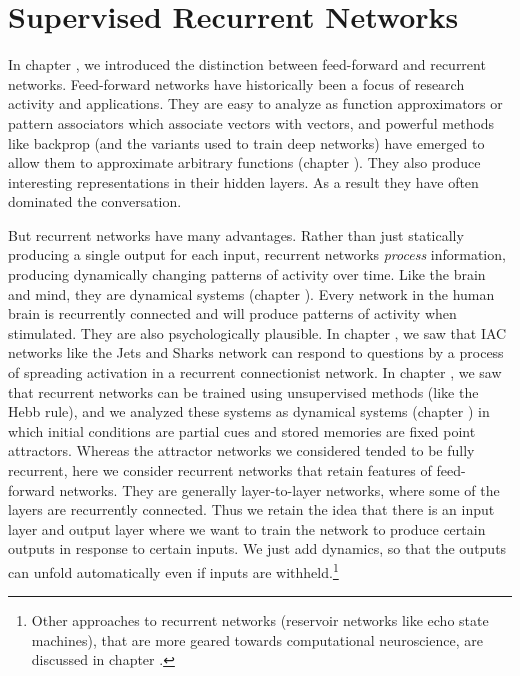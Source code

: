 \chapter{Supervised Recurrent Networks}\label{ch_supervised_recurrent}


In chapter , we introduced the distinction between feed-forward and recurrent networks. Feed-forward networks have historically been a focus of research activity and applications. They are easy to analyze as function approximators or pattern associators which associate vectors with vectors, and powerful methods like backprop (and the variants used to train deep networks) have emerged to allow them to approximate arbitrary functions (chapter ). They also produce interesting representations in their hidden layers. As a result they have often dominated the conversation.

But recurrent networks have many advantages. Rather than just statically producing a single output for each input, recurrent networks \emph{process} information, producing dynamically changing patterns of activity over time. Like the brain and mind, they are dynamical systems (chapter ). Every network in the human brain is recurrently connected and will produce patterns of activity when stimulated. They are also psychologically plausible. In chapter , we saw that IAC networks like the Jets and Sharks network can respond to questions by a process of spreading activation in a recurrent connectionist network. In chapter , we saw that recurrent networks can be trained using unsupervised methods (like the Hebb rule), and  we analyzed these systems as dynamical systems (chapter ) in which initial conditions are partial cues and stored memories are fixed point attractors.  Whereas the attractor networks we considered tended to be fully recurrent, here we consider recurrent networks that retain features of feed-forward networks. They are generally layer-to-layer networks, where some of the layers are recurrently connected. Thus we retain the idea that there is an input layer and output layer where we want to train the network to produce certain outputs in response to certain inputs.  We just add dynamics, so that the outputs can unfold automatically even if inputs are withheld.\footnote{Other approaches to recurrent networks (reservoir networks like echo state machines), that are more geared towards computational neuroscience, are discussed in chapter .}

